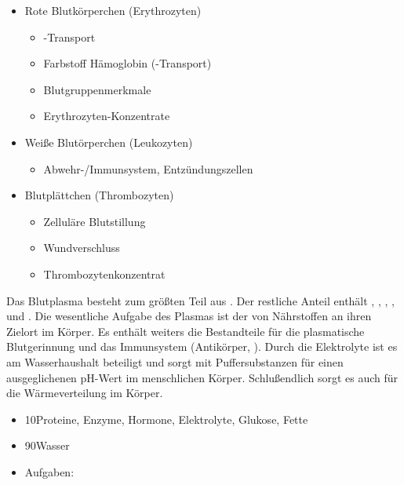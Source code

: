 \documentclass[
ngerman,
paper=a4,
asymmetric,
fontsize=10pt,
draft=false,
numbers=noenddot,
bibtotocnumbered,
footnotes=multiple,
]{scrreprt}
\begin{document}
{
\begin{itemize}
  \item Rote Blutkörperchen (Erythrozyten)
  \begin{itemize}
    \item {}-Transport
    \item Farbstoff Hämoglobin (-Transport)
    \item Blutgruppenmerkmale
    \item Erythrozyten-Konzentrate
  \end{itemize}
  \item Weiße Blutörperchen (Leukozyten)
  \begin{itemize}
    \item Abwehr-/Immunsystem, Entzündungszellen
  \end{itemize}
  \item Blutplättchen (Thrombozyten)
  \begin{itemize}
    \item Zelluläre Blutstillung
    \item Wundverschluss
    \item Thrombozytenkonzentrat
  \end{itemize}
\end{itemize}
}{}{}{}





{%
%
Das Blutplasma besteht zum größten Teil aus . Der
restliche Anteil enthält , ,
, ,  und .
Die wesentliche Aufgabe des Plasmas ist der 
von Nährstoffen an ihren Zielort im Körper. Es enthält
weiters die Bestandteile für die plasmatische Blutgerinnung
und das Immunsystem (Antikörper, ). Durch
die Elektrolyte ist es am Wasserhaushalt beteiligt und sorgt
mit Puffersubstanzen für einen ausgeglichenen pH-Wert im
menschlichen Körper.
Schlußendlich sorgt es auch für die Wärmeverteilung im
Körper.
}
{
\begin{itemize}
    \item 10\PC* Proteine, Enzyme, Hormone, Elektrolyte,
    Glukose, Fette
    \item 90\PC* Wasser
    \item Aufgaben:
\end{itemize}
}{}{}{}
\end{document}
